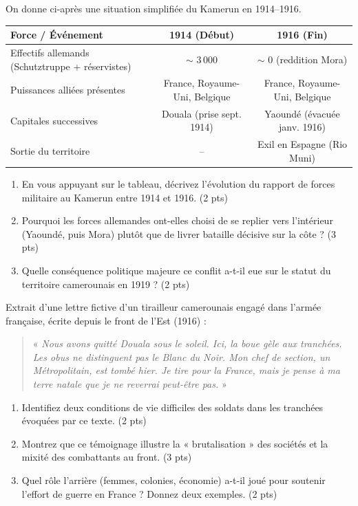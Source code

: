 \documentclass[11pt]{article}
\begin{document}
\begin{exercice}
On donne ci-après une situation simplifiée du Kamerun en 1914--1916.

\begin{center}
\begin{tabular}{|l|c|c|}
\hline
\textbf{Force / Événement} & \textbf{1914 (Début)} & \textbf{1916 (Fin)} \\ \hline
Effectifs allemands (Schutztruppe + réservistes) & $\sim$ 3\,000 & $\sim$ 0 (reddition Mora) \\ \hline
Puissances alliées présentes & France, Royaume-Uni, Belgique & France, Royaume-Uni, Belgique \\ \hline
Capitales successives & Douala (prise sept. 1914) & Yaoundé (évacuée janv. 1916) \\ \hline
Sortie du territoire & -- & Exil en Espagne (Rio Muni) \\ \hline
\end{tabular}
\end{center}

\begin{enumerate}
    \item En vous appuyant sur le tableau, décrivez l'évolution du rapport de forces militaire au Kamerun entre 1914 et 1916. (2 pts)
    \item Pourquoi les forces allemandes ont-elles choisi de se replier vers l'intérieur (Yaoundé, puis Mora) plutôt que de livrer bataille décisive sur la côte ? (3 pts)
    \item Quelle conséquence politique majeure ce conflit a-t-il eue sur le statut du territoire camerounais en 1919 ? (2 pts)
\end{enumerate}
\end{exercice}

\begin{exercice}
Extrait d'une lettre fictive d'un tirailleur camerounais engagé dans l'armée française, écrite depuis le front de l'Est (1916) : 
\begin{quote}
« \textit{Nous avons quitté Douala sous le soleil. Ici, la boue gèle aux tranchées. Les obus ne distinguent pas le Blanc du Noir. Mon chef de section, un Métropolitain, est tombé hier. Je tire pour la France, mais je pense à ma terre natale que je ne reverrai peut-être pas.} »
\end{quote}

\begin{enumerate}
    \item Identifiez deux conditions de vie difficiles des soldats dans les tranchées évoquées par ce texte. (2 pts)
    \item Montrez que ce témoignage illustre la « brutalisation » des sociétés et la mixité des combattants au front. (3 pts)
    \item Quel rôle l'arrière (femmes, colonies, économie) a-t-il joué pour soutenir l'effort de guerre en France ? Donnez deux exemples. (2 pts)
\end{enumerate}
\end{exercice}
\end{document}
